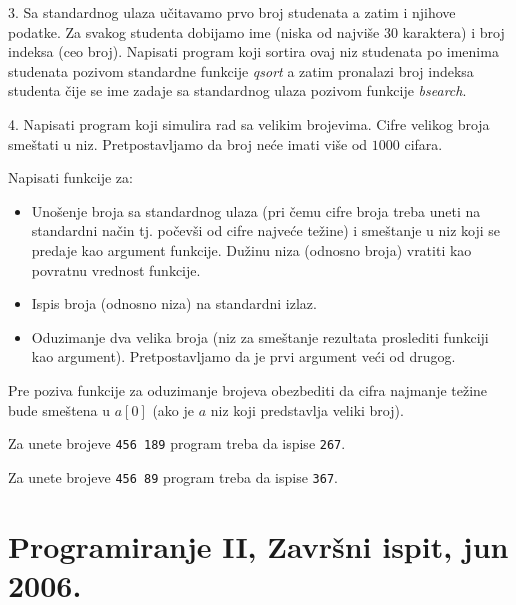 3. Sa standardnog ulaza u\v citavamo prvo broj studenata a zatim i
njihove podatke. Za svakog studenta dobijamo ime (niska od najvi\v se
30 karaktera) i broj indeksa (ceo broj). Napisati program koji
sortira ovaj niz studenata po imenima studenata pozivom standardne
funkcije \emph{qsort} a zatim pronalazi broj indeksa studenta \v cije
se ime zadaje sa standardnog ulaza pozivom funkcije \emph{bsearch}.

4. Napisati program koji simulira rad sa velikim brojevima.
Cifre velikog broja sme\v stati u niz. Pretpostavljamo da broj
ne\' ce imati vi\v se od $1000$ cifara.

Napisati funkcije za:
\begin{itemize}
\item Uno\v senje broja sa standardnog ulaza (pri \v cemu cifre
broja treba uneti na standardni na\v cin tj. po\v cev\v si od
cifre najve\' ce te\v zine) i sme\v stanje u niz koji se predaje
kao argument funkcije. Du\v zinu niza (odnosno broja) vratiti kao
povratnu vrednost funkcije.
\item Ispis broja (odnosno niza) na standardni izlaz.
\item Oduzimanje dva velika broja (niz za sme\v stanje rezultata proslediti
funkciji kao argument). Pretpostavljamo da je prvi argument ve\' ci od drugog.
\end{itemize}

Pre poziva funkcije za oduzimanje brojeva obezbediti da cifra najmanje
te\v zine bude sme\v stena u $a[0]$ (ako je $a$ niz koji predstavlja
veliki broj).

Za unete brojeve {\tt 456 189} program treba da ispise {\tt 267}.

Za unete brojeve {\tt 456 89} program treba da ispise {\tt 367}.
\vspace*{3mm}



\section{Programiranje II, Zavr\v{s}ni ispit, jun 2006.}



